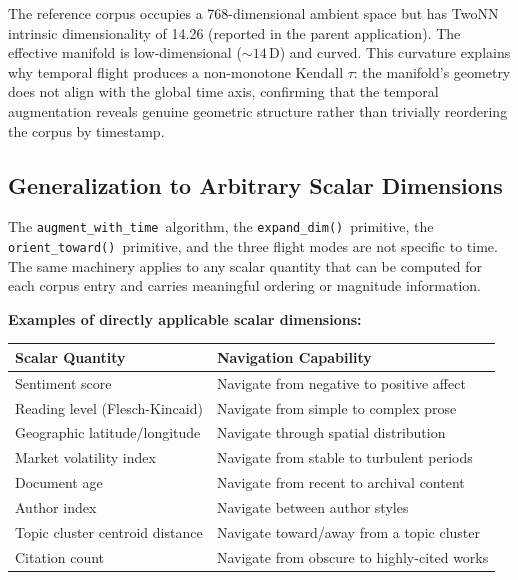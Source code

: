 \documentclass[12pt,letterpaper]{article}
\newcommand{\augtime}{\texttt{augment\_with\_time}}
\newcommand{\expanddim}{\texttt{expand\_dim()}}
\newcommand{\orienttoward}{\texttt{orient\_toward()}}
\begin{document}
The reference corpus occupies a 768-dimensional ambient space but has
TwoNN intrinsic dimensionality of 14.26 (reported in the parent application).
The effective manifold is low-dimensional ($\sim 14$\,D) and curved. This
curvature explains why temporal flight produces a non-monotone Kendall $\tau$:
the manifold's geometry does not align with the global time axis, confirming
that the temporal augmentation reveals genuine geometric structure rather than
trivially reordering the corpus by timestamp.

\subsection{Generalization to Arbitrary Scalar Dimensions}
\label{sec:generalization}

The \augtime\ algorithm, the \expanddim\ primitive, the \orienttoward\
primitive, and the three flight modes are not specific to time. The same
machinery applies to any scalar quantity that can be computed for each corpus
entry and carries meaningful ordering or magnitude information.

\textbf{Examples of directly applicable scalar dimensions:}

\begin{center}
\begin{tabular}{ll}
  \toprule
  \textbf{Scalar Quantity} & \textbf{Navigation Capability} \\
  \midrule
  Sentiment score          & Navigate from negative to positive affect \\
  Reading level (Flesch-Kincaid) & Navigate from simple to complex prose \\
  Geographic latitude/longitude & Navigate through spatial distribution \\
  Market volatility index  & Navigate from stable to turbulent periods \\
  Document age             & Navigate from recent to archival content \\
  Author index             & Navigate between author styles \\
  Topic cluster centroid distance & Navigate toward/away from a topic cluster \\
  Citation count           & Navigate from obscure to highly-cited works \\
  \bottomrule
\end{tabular}
\end{center}
\end{document}
